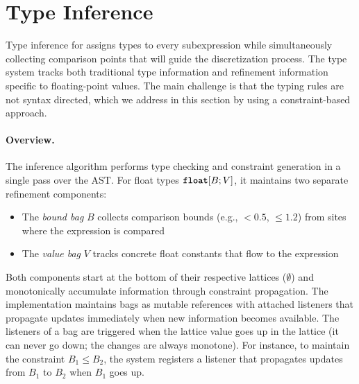 \section{Type Inference}\label{sec:type-inference}

Type inference for \Slice{} assigns types to every subexpression while simultaneously collecting comparison points that will guide the discretization process. The type system tracks both traditional type information and refinement information specific to floating-point values. The main challenge is that the typing rules are not syntax directed, which we address in this section by using a constraint-based approach.

\paragraph{Overview.}
The inference algorithm performs type checking and constraint generation in a single pass over the AST. For float types $\textnormal{\ttfamily\bfseries float}[B; V]$, it maintains two separate refinement components:
\begin{itemize}
    \item The \emph{bound bag} $B$ collects comparison bounds (e.g., $<\!\!0.5$, $\leq\!\!1.2$) from sites where the expression is compared
    \item The \emph{value bag} $V$ tracks concrete float constants that flow to the expression
\end{itemize}

Both components start at the bottom of their respective lattices ($\emptyset$) and monotonically accumulate information through constraint propagation. The implementation maintains bags as mutable references with attached listeners that propagate updates immediately when new information becomes available. The listeners of a bag are triggered when the lattice value goes up in the lattice (it can never go down; the changes are always monotone).
For instance, to maintain the constraint $B_1 \leq B_2$, the system registers a listener that propagates updates from $B_1$ to $B_2$ when $B_1$ goes up.

